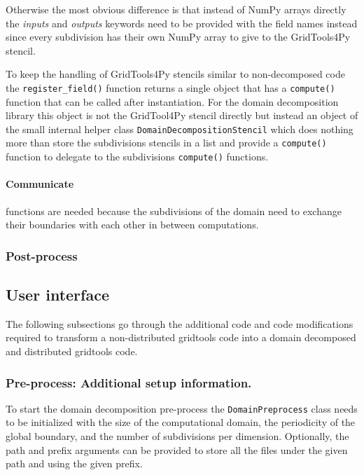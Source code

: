 Otherwise the most obvious difference is that instead of NumPy arrays directly the \textit{inputs} and \textit{outputs} keywords need to be provided with the field names instead since every subdivision has their own NumPy array to give to the GridTools4Py stencil.

To keep the handling of GridTools4Py stencils similar to non-decomposed code the \texttt{register\_field()} function returns a single object that has a \texttt{compute()} function that can be called after instantiation.
For the domain decomposition library this object is not the GridTool4Py stencil directly but instead an object of the small internal helper class \texttt{DomainDecompositionStencil} which does nothing more than store the subdivisions stencils in a list and provide a \texttt{compute()} function to delegate to the subdivisions \texttt{compute()} functions.

\paragraph{Communicate } functions are needed because the subdivisions of the domain need to exchange their boundaries with each other in between computations.

\subsubsection{Post-process}

\newpage
\subsection{User interface}
The following subsections go through the additional code and code modifications required to transform a non-distributed gridtools code into a domain decomposed and distributed gridtools code.

\subsubsection{Pre-process: Additional setup information.}
\label{sec:userpreprocess}
To start the domain decomposition pre-process the \texttt{DomainPreprocess} class needs to be initialized with the size of the computational domain, the periodicity of the global boundary, and the number of subdivisions per dimension.
Optionally, the path and prefix arguments can be provided to store all the files under the given path and using the given prefix.

